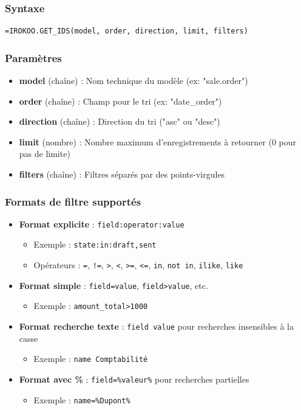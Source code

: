 \documentclass[12pt, a4paper]{article}
\begin{document}
\subsubsection{Syntaxe}
\begin{lstlisting}
=IROKOO.GET_IDS(model, order, direction, limit, filters)
\end{lstlisting}

\subsubsection{Paramètres}
\begin{itemize}
    \item \textbf{model} (chaîne) : Nom technique du modèle (ex: "sale.order")
    \item \textbf{order} (chaîne) : Champ pour le tri (ex: "date\_order")
    \item \textbf{direction} (chaîne) : Direction du tri ("asc" ou "desc")
    \item \textbf{limit} (nombre) : Nombre maximum d'enregistrements à retourner (0 pour pas de limite)
    \item \textbf{filters} (chaîne) : Filtres séparés par des points-virgules
\end{itemize}

\subsubsection{Formats de filtre supportés}
\begin{itemize}
    \item \textbf{Format explicite} : \texttt{field:operator:value}
    \begin{itemize}
        \item Exemple : \texttt{state:in:draft,sent}
        \item Opérateurs : \texttt{=}, \texttt{!=}, \texttt{>}, \texttt{<}, \texttt{>=}, \texttt{<=}, \texttt{in}, \texttt{not in}, \texttt{ilike}, \texttt{like}
    \end{itemize}
    \item \textbf{Format simple} : \texttt{field=value}, \texttt{field>value}, etc.
    \begin{itemize}
        \item Exemple : \texttt{amount\_total>1000}
    \end{itemize}
    \item \textbf{Format recherche texte} : \texttt{field~value} pour recherches insensibles à la casse
    \begin{itemize}
        \item Exemple : \texttt{name~Comptabilité}
    \end{itemize}
    \item \textbf{Format avec \%} : \texttt{field=\%valeur\%} pour recherches partielles
    \begin{itemize}
        \item Exemple : \texttt{name=\%Dupont\%}
    \end{itemize}
\end{itemize}
\end{document}

